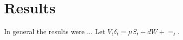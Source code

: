 
\chapter{ Results } \label{chapter-r}

\minitoc

In general the results were ... Let $V_{t} \delta_{t} = \mu S_{t} + dW+=_{t}$.
